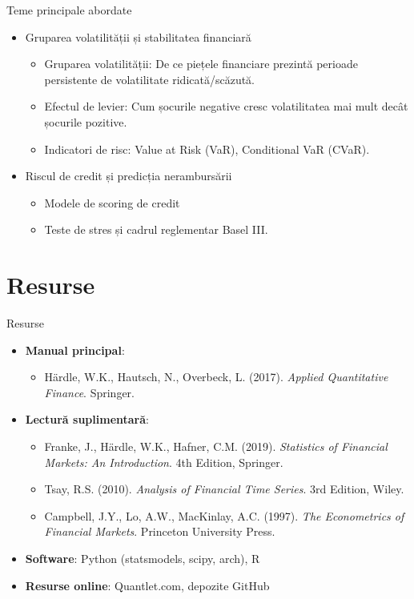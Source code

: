 \documentclass[9pt, aspectratio=169, t]{beamer}
\theoremstyle{definition}
\begin{document}
\begin{frame}{Teme principale abordate}
\begin{itemize}
    \item Gruparea volatilității și stabilitatea financiară
    \begin{itemize}
        \item Gruparea volatilității: De ce piețele financiare prezintă perioade persistente de volatilitate ridicată/scăzută.
        \item Efectul de levier: Cum șocurile negative cresc volatilitatea mai mult decât șocurile pozitive.
        \item Indicatori de risc: Value at Risk (VaR), Conditional VaR (CVaR).
    \end{itemize}
    \item Riscul de credit și predicția nerambursării
    \begin{itemize}
        \item Modele de scoring de credit
        \item Teste de stres și cadrul reglementar Basel III.
    \end{itemize}
\end{itemize}
\end{frame}

\section{Resurse}

\begin{frame}{Resurse}
\begin{itemize}
    \item \textbf{Manual principal}:
    \begin{itemize}
        \item H\"{a}rdle, W.K., Hautsch, N., Overbeck, L. (2017). \textit{Applied Quantitative Finance}. Springer.
    \end{itemize}
    \item \textbf{Lectură suplimentară}:
    \begin{itemize}
        \item Franke, J., H\"{a}rdle, W.K., Hafner, C.M. (2019). \textit{Statistics of Financial Markets: An Introduction}. 4th Edition, Springer.
        \item Tsay, R.S. (2010). \textit{Analysis of Financial Time Series}. 3rd Edition, Wiley.
        \item Campbell, J.Y., Lo, A.W., MacKinlay, A.C. (1997). \textit{The Econometrics of Financial Markets}. Princeton University Press.
    \end{itemize}
    \item \textbf{Software}: Python (statsmodels, scipy, arch), R
    \item \textbf{Resurse online}: Quantlet.com, depozite GitHub
\end{itemize}
\end{frame}
\end{document}
